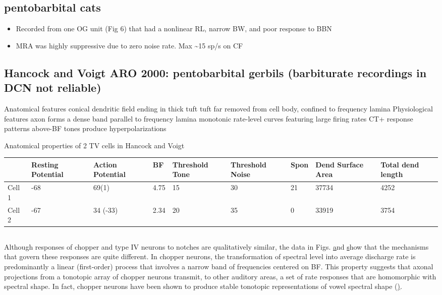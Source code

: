 \documentclass[10pt,a4paper]{article}
\begin{document}
\subsection{\citep{RhodeGreenberg:1994b} pentobarbital cats}


\begin{itemize}
\item Recorded from one OG unit (Fig 6) that had a nonlinear RL, narrow BW, and
  poor response to BBN
\item MRA was highly suppressive due to zero noise rate. Max \~{}15 sp/s on CF
\end{itemize}

\subsection{Hancock and Voigt ARO 2000: pentobarbital gerbils (barbiturate recordings in DCN
not reliable)}

Anatomical features
conical dendritic field ending in thick tuft
tuft far removed from cell body, confined to frequency lamina
Physiological features
axon forms a dense band parallel to frequency lamina
monotonic rate-level curves featuring large firing rates
CT+ response patterns
above-BF tones produce hyperpolarizations

Anatomical properties of 2 TV cells in Hancock and Voigt

\begin{flushleft}

  \begin{tabularx}{\textwidth}{XXXXXXXXX}
\toprule
       & Resting Potential & Action Potential  &  BF  & Threshold Tone & Threshold Noise
       &       Spon        & Dend Surface Area & Total dend length\\\midrule
Cell 1 &       {}-68       &       69(1)       & 4.75 &       15       & 30 & 21 & 37734 & 4252\\
Cell 2 &       {}-67       &     34 (-33)      & 2.34 &       20       & 35 & 0  & 33919 & 3754\\
\bottomrule
\end{tabularx}
\end{flushleft}


\subsection{\citep{YuYoung:2000}}

Although responses of chopper and type IV neurons to notches are qualitatively
similar, the data in Figs.
\href{www.pnas.org/cgi/content/full/97/22/11780#F5}
and
\href{www.pnas.org/cgi/content/full/97/22/11780#F6}
show that the mechanisms that govern these responses are quite different. In
chopper neurons, the transformation of spectral level into average discharge
rate is predominantly a linear (first-order) process that involves a narrow band
of frequencies centered on BF. This property suggests that axonal projections
from a tonotopic array of chopper neurons transmit, to other auditory areas, a
set of rate responses that are homomorphic with spectral shape. In fact, chopper
neurons have been shown to produce stable tonotopic representations of vowel
spectral shape
(\href{www.pnas.org/cgi/content/full/97/22/11780#B8}).
\end{document}
